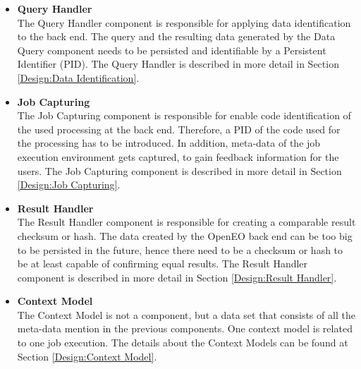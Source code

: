 \documentclass[draft,final]{vutinfth} %
\begin{document}
 \begin{itemize}
	\item \textbf{Query Handler} \\
	The Query Handler component is responsible for applying data identification to the back end. The query and the resulting data generated by the Data Query component needs to be persisted and identifiable by a Persistent Identifier (PID). The Query Handler is described in more detail in Section \ref{Design:Data Identification}.     
	\item \textbf{Job Capturing} \\ 
	The Job Capturing component is responsible for enable code identification of the used processing at the back end. Therefore, a PID of the code used for the processing has to be introduced. In addition, meta-data of the job execution environment gets captured, to gain feedback information for the users. The Job Capturing component is described in more detail in Section \ref{Design:Job Capturing}.
	\item \textbf{Result Handler} \\
	The Result Handler component is responsible for creating a comparable result checksum or hash. The data created by the OpenEO back end can be too big to be persisted in the future, hence there need to be a checksum or hash to be at least capable of confirming equal results. The Result Handler component is described in more detail in Section \ref{Design:Result Handler}.   
	\item \textbf{Context Model} \\ 
	The Context Model is not a component, but a data set that consists of all the meta-data mention in the previous components. One context model is related to one job execution. The details about the Context Models can be found at Section \ref{Design:Context Model}. 
\end{itemize}
\end{document}
